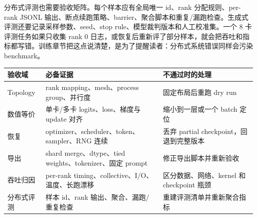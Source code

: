 \documentclass[UTF8,zihao=-4,openany]{ctexbook}
\begin{document}
分布式评测也需要验收矩阵。每个样本应有全局唯一 id、rank 分配规则、per-rank JSONL 输出、断点续跑策略、barrier、聚合脚本和重复/漏跑检查。生成式评测还要记录采样参数、seed、stop rule、模型裁判版本和人工校准集。一个 8 卡评测任务如果只收集 rank 0 日志，或恢复后重新评了部分样本，就会把吞吐和指标都写错。训练章节把这点说清楚，是为了提醒读者：分布式系统错误同样会污染 benchmark。

\begin{center}
\small
\setlength{\tabcolsep}{3pt}
\begin{tabular}{@{}p{}p{}p{}@{}}
\toprule
验收域 & 必备证据 & 不通过时的处理 \\
\midrule
Topology & rank mapping、mesh、process group、并行度 & 固定布局后重跑 dry run \\
数值等价 & 单卡/多卡 logits、loss、梯度与 update 对齐 & 缩小到一层或一个 batch 定位 \\
恢复 & optimizer、scheduler、token、sampler、RNG 连续 & 丢弃 partial checkpoint，回退到完整版本 \\
导出 & shard merge、dtype、tied weights、tokenizer、固定 prompt & 修正导出脚本并重新验收 \\
吞吐归因 & per-rank timing、collective、I/O、温度、长跑漂移 & 区分数据、网络、kernel 和 checkpoint 瓶颈 \\
分布式评测 & 样本 id、rank 输出、聚合、漏跑/重复检查 & 重建评测清单并重新聚合指标 \\
\bottomrule
\end{tabular}
\end{center}
\end{document}
